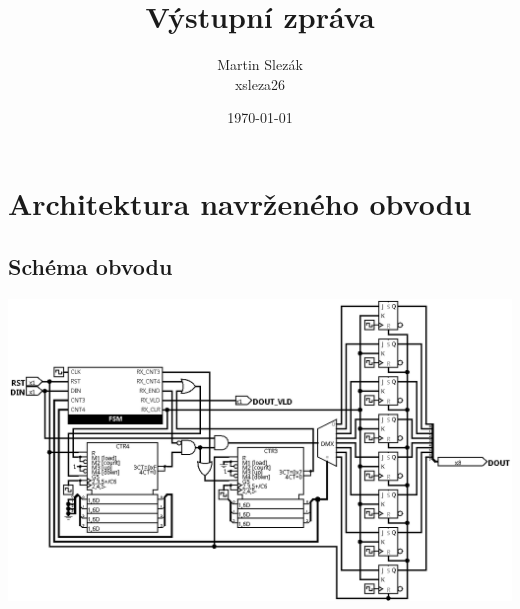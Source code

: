 \documentclass{article}
\title{Výstupní zpráva}
\author{Martin Slezák \\ xsleza26}
\date{\today}
\begin{document}
\maketitle

	\section{Architektura navrženého obvodu}

	\subsection{Schéma obvodu}
	\includegraphics[scale=0.4]{"./src/rlc.png"}
\end{document}
